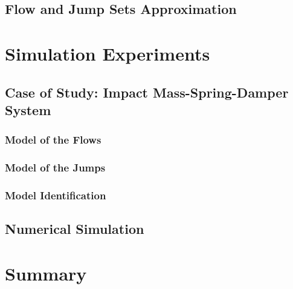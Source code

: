 \subsection{Flow and Jump Sets Approximation}

\clearpage

\section{Simulation Experiments}\label{Experiments}
\subsection{Case of Study: Impact Mass-Spring-Damper System}
\subsubsection{Model of the Flows}
\subsubsection{Model of the Jumps}
\subsubsection{Model Identification}
\subsection{Numerical Simulation}

\clearpage
\section{Summary}\label{conc}
%